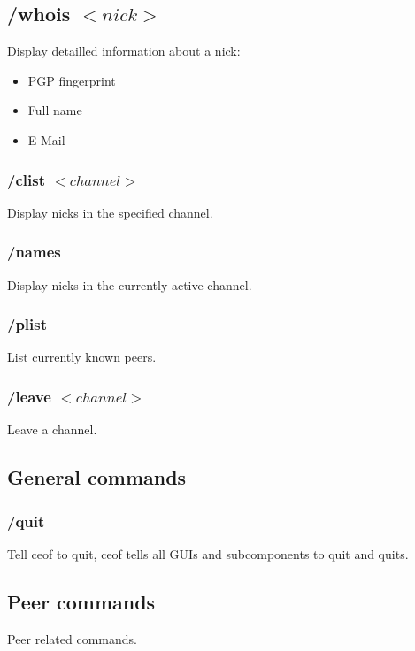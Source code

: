 \documentclass[12pt,a4paper]{article}
\begin{document}
\subsection{/whois $<nick>$}
Display detailled information about a nick:
\begin{itemize}
\item PGP fingerprint
\item Full name
\item E-Mail
\end{itemize}

\subsubsection{/clist $<channel>$}
Display nicks in the specified channel.

\subsubsection{/names}
Display nicks in the currently active channel.

\subsubsection{/plist}
List currently known peers.

\subsubsection{/leave $<channel>$}
Leave a channel.

\subsection{General commands}
\subsubsection{/quit}
Tell ceof to quit, ceof tells all GUIs and subcomponents to quit and quits.

\subsection{Peer commands}
Peer related commands.
\end{document}
